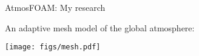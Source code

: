 \begin{slide}{AtmosFOAM: My research}

An adaptive mesh model of the global atmosphere:

\texttt{[image: figs/mesh.pdf]}

\end{slide}
